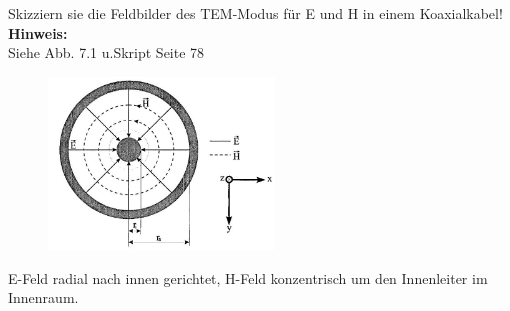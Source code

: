 \begin{question}[section=7,name={Feldbild},difficulty=,quantity=5,type=thr,tags={}]
	Skizziern sie die Feldbilder des TEM-Modus für E und H in einem Koaxialkabel!
	\\ \textbf{Hinweis:}\\
	Siehe Abb. 7.1 u.Skript Seite 78
\end{question}
\begin{solution}
	\begin{figure}[H]
		\includegraphics[width=6cm]{./opn/exm/thr/chp/7/1/bild.jpeg}
	\end{figure}
	E-Feld radial nach innen gerichtet, H-Feld konzentrisch um den Innenleiter im Innenraum.
\end{solution}